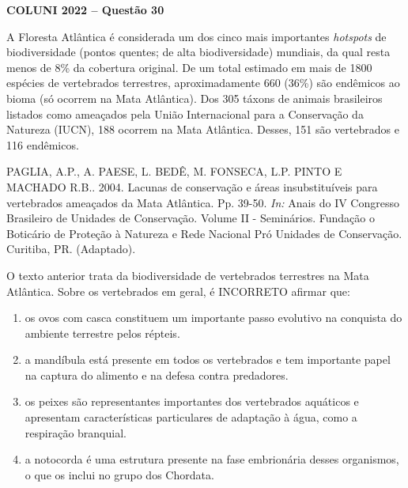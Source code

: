 \textbf{COLUNI 2022 -- Questão 30}\par\medskip A Floresta Atlântica é considerada um dos cinco mais importantes \textit{hotspots} de biodiversidade (pontos quentes; de alta biodiversidade) mundiais, da qual resta menos de 8\% da cobertura original. De um total estimado em mais de 1800 espécies de vertebrados terrestres, aproximadamente 660 (36\%) são endêmicos ao bioma (só ocorrem na Mata Atlântica). Dos 305 táxons de animais brasileiros listados como ameaçados pela União Internacional para a Conservação da Natureza (IUCN), 188 ocorrem na Mata Atlântica. Desses, 151 são vertebrados e 116 endêmicos.

\par

PAGLIA, A.P., A. PAESE, L. BEDÊ, M. FONSECA, L.P. PINTO E MACHADO R.B.. 2004. Lacunas de conservação e áreas insubstituíveis para vertebrados ameaçados da Mata Atlântica. Pp. 39-50. \textit{In:} Anais do IV Congresso Brasileiro de Unidades de Conservação. Volume II - Seminários. Fundação o Boticário de Proteção à Natureza e Rede Nacional Pró Unidades de Conservação. Curitiba, PR. (Adaptado).

\par

O texto anterior trata da biodiversidade de vertebrados terrestres na Mata Atlântica. Sobre os vertebrados em geral, é INCORRETO afirmar que:\begin{enumerate}
\item os ovos com casca constituem um importante passo evolutivo na conquista do ambiente terrestre pelos
      répteis.
\item a mandíbula está presente em todos os vertebrados e tem importante papel na captura do alimento e na
      defesa contra predadores.
\item os peixes são representantes importantes dos vertebrados aquáticos e apresentam características
      particulares de adaptação à água, como a respiração branquial.
\item a notocorda é uma estrutura presente na fase embrionária desses organismos, o que os inclui no grupo
      dos Chordata.\end{enumerate}
